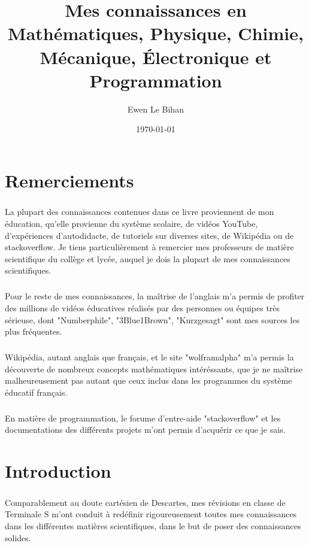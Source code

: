 \documentclass[a4paper]{book}
\title{Mes connaissances en Mathématiques, Physique, Chimie, Mécanique, Électronique et Programmation}
\author{Ewen Le Bihan}
\date{\today}
\begin{document}
 
\maketitle
 
    \frontmatter
 
    \chapter{Remerciements}
    \paragraph{}
    La plupart des connaissances contenues dans ce livre proviennent de mon éducation, qu'elle provienne du système scolaire, de vidéos YouTube, d'expériences d'autodidacte, de tutoriels sur diverses sites, de Wikipédia ou de stackoverflow. Je tiens particulièrement à remercier mes professeurs de matière scientifique du collège et lycée, auquel je dois la plupart de mes connaissances scientifiques.
    \paragraph{}
    Pour le reste de mes connaissances, la maîtrise de l'anglais m'a permis de profiter des millions de vidéos éducatives réalisés par des personnes ou équipes très sérieuse, dont "Numberphile", "3Blue1Brown", "Kurzgesagt" sont mes sources les plus fréquentes.
    \paragraph{}
    Wikipédia, autant anglais que français, et le site "wolframalpha" m'a permis la découverte de nombreux concepts mathématiques intéréssants, que je ne maîtrise malheureusement pas autant que ceux inclus dans les programmes du système éducatif français.
    \paragraph{}
    En matière de programmation, le forume d'entre-aide "stackoverflow" et les documentations des différents projets m'ont permis d'acquérir ce que je sais.
    \chapter{Introduction}
    \paragraph{}
    Comparablement au doute cartésien de Descartes, mes révisions en classe de Terminale S m'ont conduit à redéfinir rigoureusement toutes mes connaissances dans les différentes matières scientifiques, dans le but de poser des connaissances solides.
\end{document}
